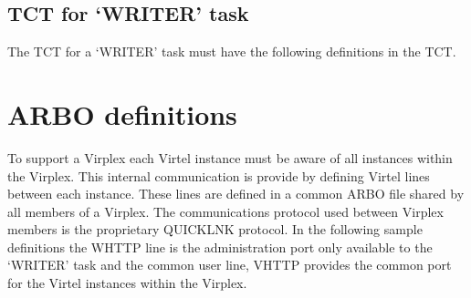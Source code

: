 \documentclass[letterpaper,10pt,english]{sphinxmanual}
\begin{document}
\subsection{TCT for ‘WRITER’ task}
\label{\detokenize{connectivity_guide:tct-for-writer-task}}
\sphinxAtStartPar
The TCT for a ‘WRITER’ task must have the following definitions in the TCT.

\begin{sphinxVerbatim}[commandchars=\\\{\}]
                               
                              
  
                   
  
                       
                       
\end{sphinxVerbatim}

\ignorespaces 

\section{ARBO definitions}
\label{\detokenize{connectivity_guide:arbo-definitions}}\label{\detokenize{connectivity_guide:index-179}}
\sphinxAtStartPar
To support a Virplex each Virtel instance must be aware of all instances within the Virplex. This internal communication is provide by defining Virtel lines between each instance. These lines are defined in a common ARBO file shared by all members of a Virplex. The communications protocol used between Virplex members is the proprietary QUICKLNK protocol. In the following sample definitions the W\sphinxhyphen{}HTTP line is the administration port only available to the ‘WRITER’ task and the common user line, V\sphinxhyphen{}HTTP provides the common port for the Virtel instances within the Virplex.
\end{document}
